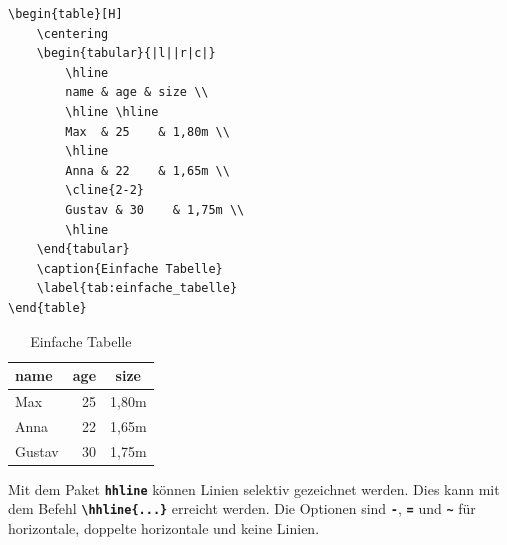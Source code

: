 \begin{minipage}{0.5\textwidth}
    \begin{lstlisting}[language={[LaTeX]TeX}]
\begin{table}[H]
    \centering
    \begin{tabular}{|l||r|c|}
        \hline
        name & age & size \\
        \hline \hline
        Max  & 25    & 1,80m \\
        \hline
        Anna & 22    & 1,65m \\
        \cline{2-2}
        Gustav & 30    & 1,75m \\
        \hline
    \end{tabular}
    \caption{Einfache Tabelle}
    \label{tab:einfache_tabelle}
\end{table}
\end{lstlisting}
\end{minipage}
\hfill
\begin{minipage}{0.5\textwidth}
    \begin{table}[H]
        \centering
        \begin{tabular}{|l||r|c|}
            \hline
            name   & age & size  \\
            \hline \hline
            Max    & 25  & 1,80m \\
            \hline
            Anna   & 22  & 1,65m \\
            \cline{2-2}
            Gustav & 30  & 1,75m \\
            \hline
        \end{tabular}
        \caption{Einfache Tabelle}
        \label{tab:einfache_tabelle}
    \end{table}
\end{minipage}


Mit dem Paket \textbf{\texttt{hhline}} können Linien selektiv gezeichnet werden. Dies kann mit dem Befehl \textbf{\texttt{\textbackslash hhline\{...\}}} erreicht werden.
Die Optionen sind \textbf{\texttt{-}}, \textbf{\texttt{=}} und \textbf{\texttt{\textasciitilde}} für horizontale, doppelte horizontale und keine Linien.

